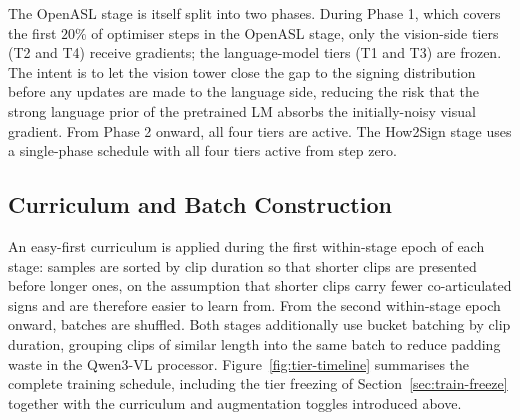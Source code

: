 \documentclass{article}
\begin{document}
The OpenASL stage is itself split into two phases. During Phase 1, which
covers the first $20\%$ of optimiser steps in the OpenASL stage, only the
vision-side tiers (T2 and T4) receive gradients; the language-model tiers
(T1 and T3) are frozen. The intent is to let the vision tower close the gap
to the signing distribution before any updates are made to the language
side, reducing the risk that the strong language prior of the pretrained LM
absorbs the initially-noisy visual gradient. From Phase 2 onward, all four
tiers are active. The How2Sign stage uses a single-phase schedule with all
four tiers active from step zero.

\subsection{Curriculum and Batch Construction}
\label{sec:train-sampling}

An easy-first curriculum is applied during the first within-stage epoch of
each stage: samples are sorted by clip duration so that shorter clips are
presented before longer ones, on the assumption that shorter clips carry
fewer co-articulated signs and are therefore easier to learn from. From the
second within-stage epoch onward, batches are shuffled. Both stages
additionally use bucket batching by clip duration, grouping clips of similar
length into the same batch to reduce padding waste in the Qwen3-VL
processor.
Figure~\ref{fig:tier-timeline} summarises the complete training schedule,
including the tier freezing of Section~\ref{sec:train-freeze} together with
the curriculum and augmentation toggles introduced above.
\end{document}
